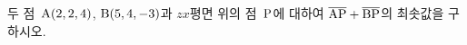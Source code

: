 두 점~$\mathrm{A}(2{,}\mkern3mu\mathopen{}2{,}\mkern3mu\mathopen{}4)$, $\mathrm{B}(5{,}\mkern3mu\mathopen{}4{,}\mkern3mu\mathopen{}-3)$과 $zx$평면 위의 점~$\mathrm{P}$에 대하여 $\overline{\mathrm{AP}}+\overline{\mathrm{BP}}$의 최솟값을 구하시오.
